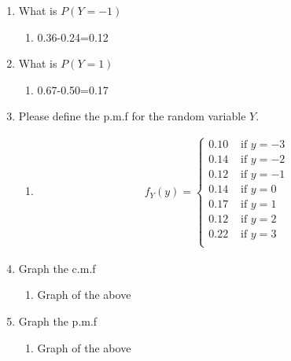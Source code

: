 \documentclass[krantz1,ChapterTOCs]{krantz}
\begin{document}
\begin{enumerate}
\begin{enumerate}
        \item What is $P(Y=-1)$
        \begin{enumerate}
            \item {\color{red} 0.36-0.24=0.12   }
        \end{enumerate}
        \item What is $P(Y= 1)$
        \begin{enumerate}
            \item {\color{red} 0.67-0.50=0.17   }
        \end{enumerate}
        \item Please define the p.m.f for the random variable $Y$.
        \begin{enumerate}
            \item {\color{red} 
            \begin{align*}
                 f_{Y}(y) = \begin{cases}
                            0.10  & \text{ if } y=-3\\
                            0.14  & \text{ if } y=-2\\
                            0.12  & \text{ if } y=-1\\
                            0.14  & \text{ if } y=0\\
                            0.17  & \text{ if } y=1\\
                            0.12  & \text{ if } y=2\\
                            0.22  & \text{ if } y=3\\
                            \end{cases}
            \end{align*}
            }
        \end{enumerate}
        \item Graph the c.m.f
        \begin{enumerate}
            \item {\color{red} Graph of the above   }
        \end{enumerate}
        \item Graph the p.m.f
        \begin{enumerate}
            \item {\color{red} Graph of the above   }
        \end{enumerate}
    \end{enumerate}


\end{enumerate}
\end{document}
